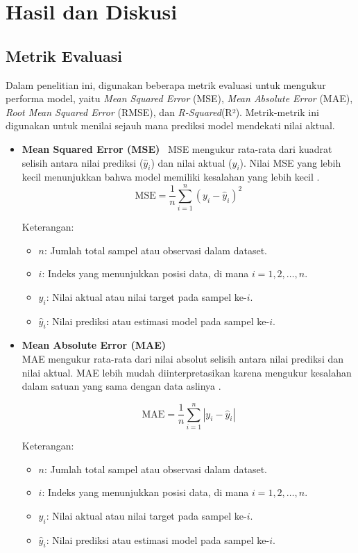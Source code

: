 \documentclass[12pt,a4paper]{article}
\begin{document}
\section{Hasil dan Diskusi}
\subsection{Metrik Evaluasi}

Dalam penelitian ini, digunakan beberapa metrik evaluasi untuk mengukur performa model, yaitu\textit{ Mean Squared Error} (MSE), \textit{Mean Absolute Error} (MAE), \textit{Root Mean Squared Error} (RMSE), dan \textit{R-Squared}(R²). Metrik-metrik ini digunakan untuk menilai sejauh mana prediksi model mendekati nilai aktual.

\begin{itemize} 
    \item \textbf{Mean Squared Error (MSE)} \ MSE mengukur rata-rata dari kuadrat selisih antara nilai prediksi ($\hat{y}_i$) dan nilai aktual ($y_i$). Nilai MSE yang lebih kecil menunjukkan bahwa model memiliki kesalahan yang lebih kecil \cite{mse}.
    \[
    \text{MSE} = \frac{1}{n} \sum_{i=1}^{n} (y_i - \hat{y}_i)^2
    \]

    Keterangan:
    \begin{itemize}
        \item $n$: Jumlah total sampel atau observasi dalam dataset.
        \item $i$: Indeks yang menunjukkan posisi data, di mana $i = 1, 2, \dots, n$.
        \item $y_i$: Nilai aktual atau nilai target pada sampel ke-$i$.
        \item $\hat{y}_i$: Nilai prediksi atau estimasi model pada sampel ke-$i$.
    \end{itemize}
    
    \item \textbf{Mean Absolute Error (MAE)} \\
    MAE mengukur rata-rata dari nilai absolut selisih antara nilai prediksi dan nilai aktual. MAE lebih mudah diinterpretasikan karena mengukur kesalahan dalam satuan yang sama dengan data aslinya \cite{mae}.
    
    \[
    \text{MAE} = \frac{1}{n} \sum_{i=1}^{n} |y_i - \hat{y}_i|
    \]
    
   Keterangan:
    \begin{itemize}
        \item $n$: Jumlah total sampel atau observasi dalam dataset.
        \item $i$: Indeks yang menunjukkan posisi data, di mana $i = 1, 2, \dots, n$.
        \item $y_i$: Nilai aktual atau nilai target pada sampel ke-$i$.
        \item $\hat{y}_i$: Nilai prediksi atau estimasi model pada sampel ke-$i$.
    \end{itemize}
    

\end{itemize}
\end{document}
